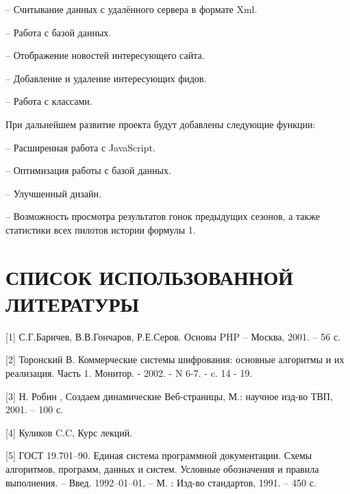 \documentclass[14pt,a4paper]{extreport}
\begin{document}
\hspace{4ex}– Считывание данных с удалённого сервера в формате Xml.

\hspace{4ex}– Работа с базой данных.

\hspace{4ex}– Отображение новостей интересующего сайта.

\hspace{4ex}– Добавление и удаление интересующих фидов.

\hspace{4ex}– Работа с классами.

		\hspace{4ex} При дальнейшем развитие проекта будут добавлены следующие функции:

\hspace{4ex}– Расширенная работа с JavaScript.

\hspace{4ex}– Оптимизация работы с базой данных.\

\hspace{4ex}–  Улучшенный дизайн.

\hspace{4ex}–  Возможность просмотра результатов гонок предыдущих сезонов, а также статистики всех пилотов истории формулы 1.





	\newpage
	\section*{\center\normalsize СПИСОК ИСПОЛЬЗОВАННОЙ ЛИТЕРАТУРЫ \endcenter}

\hspace{4ex}[1] С.Г.Баричев, В.В.Гончаров, Р.Е.Серов. Основы PHP – Москва, 2001. – 56 с.\
 
\hspace{4ex}[2] Торонский В. Коммерческие системы шифрования: основные алгоритмы и их реализация. Часть 1.  Монитор. - 2002. - N 6-7. - c. 14 - 19.\

\hspace{4ex}[3] Н. Робин , Создаем динамические Веб-страницы, М.: научное изд-во ТВП, 2001. – 100 с.\

\hspace{4ex}[4] Куликов C.C, Курс лекций.\

\hspace{4ex}[5] ГОСТ 19.701–90. Единая система программной документации. Схемы алгоритмов, программ, данных и систем. Условные обозначения и правила выполнения. – Введ. 1992–01–01. – М. : Изд-во стандартов, 1991. – 450 с.\
\end{document}
